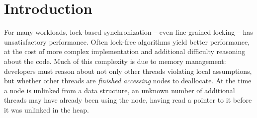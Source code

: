 \section{Introduction}
For many workloads, lock-based synchronization -- even fine-grained locking -- has unsatisfactory performance.  Often lock-free algorithms yield better performance, at the cost of more complex implementation and additional difficulty reasoning about the code.  Much of this complexity is due to memory management: 
developers must reason about not only other threads violating local assumptions, but whether other threads are \emph{finished accessing} nodes to deallocate. 
At the time a node is unlinked from a data structure, an unknown number of additional threads may have already been using the node, having read a pointer to it before it was unlinked in the heap.


